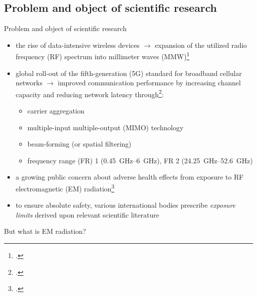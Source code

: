 \documentclass[xcolor=dvipsnames,10pt]{beamer}
\begin{document}
\subsection{Problem and object of scientific research}
\begin{frame}{Problem and object of scientific research}
    \begin{itemize}
        \item the rise of data-intensive wireless devices $\rightarrow$ expansion of the utilized radio frequency (RF) spectrum into millimeter waves (MMW)\footcite{Rappaport2013Millimeter}
        \item global roll-out of the fifth-generation (5G) standard for broadband cellular networks $\rightarrow$ improved communication performance by increasing channel capacity and reducing network latency through\footcite{Andrews2014What}:
        \begin{itemize}
            \item carrier aggregation
            \item multiple-input multiple-output (MIMO) technology
            \item beam-forming (or spatial filtering)
            \item frequency range (FR) 1 (\SIrange{0.45}{6}{\GHz}), FR 2 (\SIrange{24.25}{52.6}{\GHz})
        \end{itemize}
        \item a growing public concern about adverse health effects from exposure to RF electromagnetic (EM) radiation\footcite{Wu2015Safe}
        \item to ensure absolute safety, various international bodies prescribe \emph{exposure limits} derived upon relevant scientific literature
    \end{itemize}
\end{frame}

\begin{frame}{But what is EM radiation?}
    
\end{frame}
\end{document}
